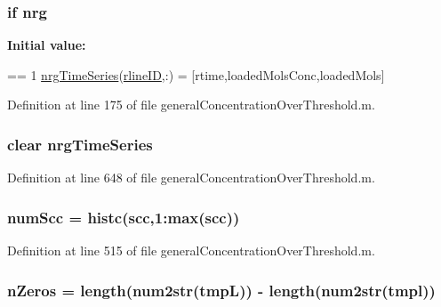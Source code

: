 \hypertarget{a00022_af837f695e5b67c86016c1a82608c38b4}{
\subsubsection[{nrg}]{ {\bf if} nrg}}\label{a00022_af837f695e5b67c86016c1a82608c38b4}
{\bfseries Initial value\-:}
\begin{DoxyCode}
== 1
                    \hyperlink{a00022_ad5f4092827ae220bd7c53532aaaa0590}{nrgTimeSeries}(\hyperlink{a00022_a8443a49765859a8631fed7e8a1d27fe5}{rlineID},:) = [rtime,loadedMolsConc,loadedMols]
\end{DoxyCode}


Definition at line 175 of file general\-Concentration\-Over\-Threshold.\-m.

\hypertarget{a00022_ad5f4092827ae220bd7c53532aaaa0590}{
\subsubsection[{nrg\-Time\-Series}]{\setlength{\rightskip}{0pt plus 5cm}clear nrg\-Time\-Series}}\label{a00022_ad5f4092827ae220bd7c53532aaaa0590}


Definition at line 648 of file general\-Concentration\-Over\-Threshold.\-m.

\hypertarget{a00022_a0d0db21d4520f7561ff56e2c80e4fb69}{
\subsubsection[{num\-Scc}]{\setlength{\rightskip}{0pt plus 5cm}num\-Scc = histc(scc,1\-:{\bf max}(scc))}}\label{a00022_a0d0db21d4520f7561ff56e2c80e4fb69}


Definition at line 515 of file general\-Concentration\-Over\-Threshold.\-m.

\hypertarget{a00022_ac4353d99277795cadf898255e2c73c71}{
\subsubsection[{n\-Zeros}]{\setlength{\rightskip}{0pt plus 5cm}n\-Zeros = length(num2str(tmp\-L)) -\/ length(num2str(tmpl))}}\label{a00022_ac4353d99277795cadf898255e2c73c71}


